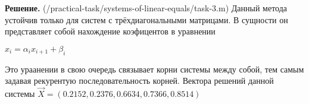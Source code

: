 \documentclass[a4paper, 12pt]{article}
\begin{document}
    \quad \textbf{Решение.} (/practical-task/systems-of-linear-equals/task-3.m) Данный метода устойчив только для систем с трёхдиагональными матрицами. В сущности он представляет собой нахождение коэфицентов в уравнении 
    
    \centering $x_i = \alpha_i x_{i+1} + \beta_i$

    \quad Это ураанении в свою очередь связывает корни системы между собой, тем самым задавая рекурентую последовательность корней. Вектора решений данной системы $\vec{X} = (0.2152,   0.2376,   0.6634,   0.7366,   0.8514)$
\end{document}
